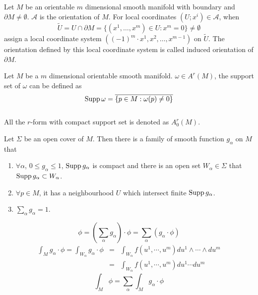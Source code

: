 \begin{newdef} 
Let $M$ be an orientable $m$ dimensional smooth manifold with boundary and $\partial M \neq \emptyset$. $\mathcal{A}$ is the orientation of $M$. For local coordinates $(U;x^i) \in \mathcal{A}$, when 
\[\tilde{U} = U \cap \partial M = \{(x^1,\ldots,x^m) \in U:x^m=0 \} \neq \emptyset\]
assign a local coordinate system $((-1)^m \cdot x^1,x^2,\ldots,x^{m-1})$ on $\tilde{U}$. The orientation defined by this local coordinate system is called induced orientation of $\partial M$.
\end{newdef}

\begin{newdef} 
Let $M$ be a $m$ dimensional orientable smooth manifold. $\omega \in A^r(M)$, the support set of $\omega$ can be defined as
\[{\rm Supp} \, \omega = \overline {\{ p \in M :\omega(p) \neq 0\}}\]\\
All the $r$-form with compact support set is denoted as $A^r_0(M)$.
\end{newdef}

\begin{newdef}
Let $\Sigma$ be an open cover of $M$. Then there is a family of smooth function $g_{\alpha}$ on $M$ that
\begin{enumerate}
\item $\forall \alpha$, $0 \leq g_{\alpha} \leq 1$, ${\rm Supp} \, g_{\alpha}$ is compact and there is an open set $W_{\alpha} \in  \Sigma$ that ${\rm Supp} \,  g_{\alpha} \subset W_{\alpha}$.
\item $\forall p \in M$, it has a neighbourhood $U$ which intersect finite ${\rm Supp} \, g_{\alpha}$.
\item $\sum_{\alpha} g_{\alpha} = 1$.
\end{enumerate}
\end{newdef}


\begin{newdef}
\[\phi = (\sum_{\alpha} g_{\alpha})\cdot \phi = \sum_{\alpha} (g_{\alpha} \cdot \phi)\]
\begin{eqnarray}
\int_{M} g_{\alpha} \cdot \phi = \int_{W_{\alpha}} g_{\alpha} \cdot \phi &=& \int_{W_{\alpha}} f(u^1,\cdots,u^m) du^1 \wedge \cdots \wedge du^m \nonumber \\
&=& \int_{W_{\alpha}} f(u^1,\cdots,u^m) du^1 \cdots du^m \nonumber
\end{eqnarray}
\[\int_{M} \phi = \sum_{\alpha} \int_{M} g_{\alpha} \cdot \phi\]
\end{newdef}

